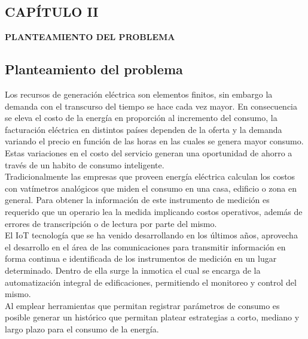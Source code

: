 \begin{center}
    \section*{CAPÍTULO II}
    \vspace*{0.5in}
    \textbf{PLANTEAMIENTO DEL PROBLEMA}
\end{center}

\subsection{Planteamiento del problema}

    Los recursos de generación eléctrica son elementos finitos, sin embargo la demanda con el transcurso del tiempo se 
    hace cada vez mayor. En consecuencia se eleva el costo de la energía en proporción al incremento del consumo, 
    la facturación eléctrica en distintos países dependen de la oferta y la demanda variando el precio
    en función de las horas en las cuales se genera mayor consumo. Estas variaciones en el costo del servicio generan una 
    oportunidad de ahorro a través de un habito de consumo inteligente.\\
    
    Tradicionalmente las empresas que proveen energía eléctrica calculan los costos con vatímetros analógicos que miden el 
    consumo en una casa, edificio o zona en general. Para obtener la información de este instrumento de medición es 
    requerido que un operario lea la medida implicando costos operativos, además de errores de transcripción o de lectura
    por parte del mismo.\\

    El IoT tecnología que se ha venido desarrollando en los últimos años, aprovecha el desarrollo en el área de las 
    comunicaciones para transmitir información en forma continua e identificada de los instrumentos de medición en un
    lugar determinado. Dentro de ella surge la inmotica el cual se encarga de la automatización integral de
    edificaciones, permitiendo el monitoreo y control del mismo.\\
    
    Al emplear herramientas que permitan registrar parámetros de consumo es posible generar un histórico que permitan 
    platear estrategias a corto, mediano y largo plazo para el consumo de la energía.\\

